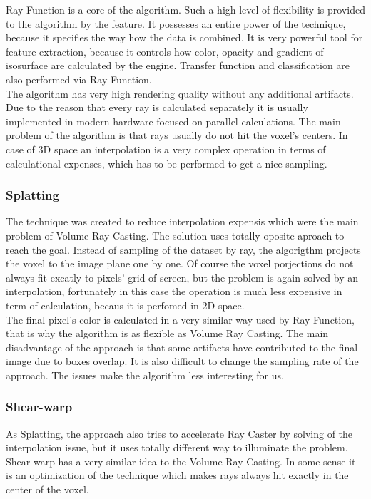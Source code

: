 \documentclass[twoside, english, 11pt]{report}
\begin{document}
Ray Function is a core of the algorithm. Such a high level of flexibility is provided to the algorithm by the feature. It possesses an entire power of the technique, because it specifies the way how the data is combined.  It is very powerful tool for feature extraction, because it controls how color, opacity and gradient of isosurface are calculated by the engine. Transfer function and classification are also performed via Ray Function.\\

The algorithm has very high rendering quality without any additional artifacts. Due to the reason that every ray is calculated separately it is usually implemented in modern hardware focused on parallel calculations. The main problem of the algorithm is that rays usually do not hit the voxel's centers. In case of 3D space an interpolation is a very complex operation in terms of calculational expenses, which has to be performed to get a nice sampling.
\subsubsection{Splatting}

The technique was created to reduce interpolation expensis which were the main problem of Volume Ray Casting. The solution uses totally oposite aproach to reach the goal. Instead of sampling of the dataset by ray, the algorigthm projects the voxel to the image plane one by one. Of course the voxel porjections do not always fit excatly to pixels' grid of screen, but the problem is again solved by an interpolation, fortunately in this case the operation is much less expensive in term of calculation, becaus it is perfomed in 2D space. \\

The final pixel's color is calculated in a very similar way used by Ray Function, that is why the algorithm is as flexible as Volume Ray Casting. The main disadvantage of the approach is that some artifacts have contributed to the final image due to boxes overlap. It is also difficult to change the sampling rate of the approach. The issues make the algorithm less interesting for us. 

\subsubsection{Shear-warp}

As Splatting, the approach also tries to accelerate Ray Caster by solving of the interpolation issue, but it uses totally different way to illuminate the problem. Shear-warp has a very similar idea to the Volume Ray Casting. In some sense it is an optimization of the technique which makes rays always hit exactly in the center of the voxel.\\
\end{document}
